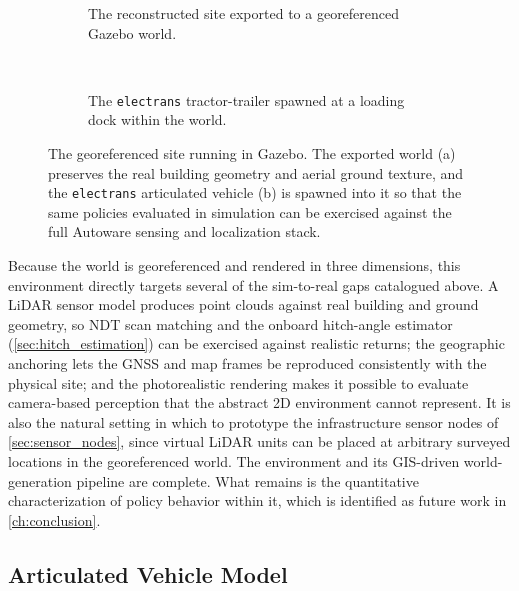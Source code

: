 \begin{figure}[H]
    \centering
    \begin{subfigure}[b]{0.9\textwidth}
        \centering
        \caption{The reconstructed site exported to a georeferenced Gazebo world.}
        \label{fig:geo_sim_gazebo_world}
    \end{subfigure}
    \\[0.75em]
    \begin{subfigure}[b]{0.9\textwidth}
        \centering
        \caption{The \texttt{electrans} tractor-trailer spawned at a loading dock within the world.}
        \label{fig:geo_sim_gazebo_vehicle}
    \end{subfigure}
    \caption{The georeferenced site running in Gazebo. The exported world (a) preserves the real building geometry and aerial ground texture, and the \texttt{electrans} articulated vehicle (b) is spawned into it so that the same policies evaluated in simulation can be exercised against the full Autoware sensing and localization stack.}
    \label{fig:geo_sim_gazebo}
\end{figure}

Because the world is georeferenced and rendered in three dimensions, this environment directly targets several of the sim-to-real gaps catalogued above. A LiDAR sensor model produces point clouds against real building and ground geometry, so NDT scan matching and the onboard hitch-angle estimator (\cref{sec:hitch_estimation}) can be exercised against realistic returns; the geographic anchoring lets the GNSS and map frames be reproduced consistently with the physical site; and the photorealistic rendering makes it possible to evaluate camera-based perception that the abstract 2D environment cannot represent. It is also the natural setting in which to prototype the infrastructure sensor nodes of \cref{sec:sensor_nodes}, since virtual LiDAR units can be placed at arbitrary surveyed locations in the georeferenced world. The environment and its GIS-driven world-generation pipeline are complete. What remains is the quantitative characterization of policy behavior within it, which is identified as future work in \cref{ch:conclusion}.

\subsection{Articulated Vehicle Model}
\label{sec:electrans_model}

